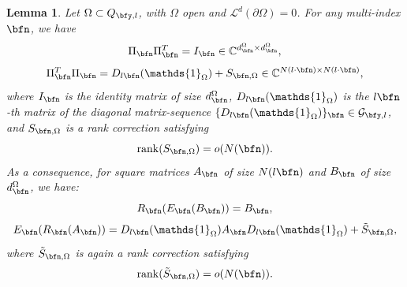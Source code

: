 \documentclass{amsart}
\newtheorem{lem}[thm]{Lemma}
\begin{document}
\begin{lem}\label{restr_ext_reduced_GLT}
    Let $\Omega\subset Q_{\bfy,l}$, with $\Omega$ open and $\mathcal{L}^d(\partial\Omega)=0$. For any multi-index $\bfn$, we have 
	\begin{equation}\label{la_stessa_dell_altro}
    \Pi_{\bfn}\Pi_{\bfn}^T = I_{\bfn}\in\mathbb{C}^{d_{\bfn}^{\Omega}\times d_{\bfn}^{\Omega}},
	\end{equation}
	\begin{equation}\label{piccola_rank_correction}
    \Pi_{\bfn}^T \Pi_{\bfn} = D_{l\bfn}(\mathds{1}_{\Omega})+S_{\bfn,\Omega}\in\mathbb{C}^{N(l\cdot \bfn)\times N(l\cdot\bfn)},
	\end{equation}
	where $I_{\bfn}$ is the identity matrix of size $d_\bfn^{\Omega}$, $D_{l\bfn}(\mathds{1}_{\Omega})$ is the $l\bfn$-th matrix of the diagonal matrix-sequence $\{D_{l\bfn}(\mathds{1}_{\Omega})\}_\bfn\in\mathcal{G}_{{\bfy},l}$, and $S_{\bfn,\Omega}$ is a rank correction satisfying
    \begin{equation*}
        \mathrm{rank}(S_{\bfn,\Omega})=o(N(\bfn)).
    \end{equation*}
	As a consequence, for square matrices $A_{\bfn}$ of size $N(l\bfn)$ and $B_{\bfn}$ of size $d_{\bfn}^{\Omega}$, we have:
	\begin{equation*}
		R_{\bfn}(E_{\bfn}(B_{\bfn}))=B_{\bfn},
	\end{equation*}
	\begin{equation*}
		E_{\bfn}(R_{\bfn}(A_{\bfn}))=D_{l\bfn}(\mathds{1}_{\Omega})A_{\bfn}D_{l\bfn}(\mathds{1}_{\Omega})+\tilde{S}_{\bfn,\Omega},
	\end{equation*}
    where $\tilde{S}_{\bfn,\Omega}$ is again a rank correction satisfying
    \begin{equation*}
        \mathrm{rank}(\tilde{S}_{\bfn,\Omega})=o(N(\bfn)).
    \end{equation*}
\end{lem}
\end{document}
